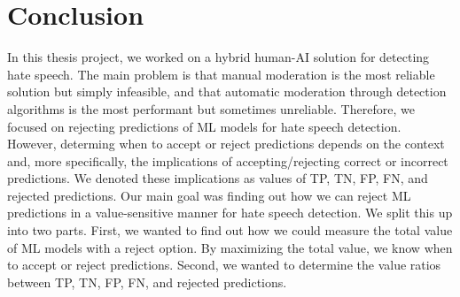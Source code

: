 \chapter{Conclusion}
In this thesis project, we worked on a hybrid human-AI solution for detecting hate speech.
%
The main problem is that manual moderation is the most reliable solution but simply infeasible, and that automatic moderation through detection algorithms is the most performant but sometimes unreliable.
%
Therefore, we focused on rejecting predictions of ML models for hate speech detection.
%
However, determing when to accept or reject predictions depends on the context and, more specifically, the implications of accepting/rejecting correct or incorrect predictions.
%
We denoted these implications as values of TP, TN, FP, FN, and rejected predictions.
%
Our main goal was finding out how we can reject ML predictions in a value-sensitive manner for hate speech detection.
%
We split this up into two parts.
%
First, we wanted to find out how we could measure the total value of ML models with a reject option.
%
By maximizing the total value, we know when to accept or reject predictions.
%
%
Second, we wanted to determine the value ratios between TP, TN, FP, FN, and rejected predictions.
%
%
